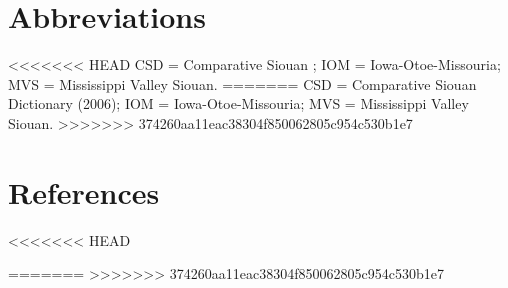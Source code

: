 \documentclass[output=paper]{LSP/langsci}
\begin{document}
\section*{Abbreviations}

<<<<<<< HEAD
CSD = Comparative Siouan \citet{Dictionary2006}; IOM = Iowa-Otoe-Missouria; MVS = Mississippi Valley Siouan.
=======
CSD = Comparative Siouan Dictionary (2006); IOM = Iowa-Otoe-Missouria; MVS = Mississippi Valley Siouan.
>>>>>>> 374260aa11eac38304f850062805c954c530b1e7


\section*{References} 

<<<<<<< HEAD

\printbibliography[heading=subbibliography,notkeyword=this]
=======
\newenvironment{reflist} {\begin{list} {} {\listparindent -.25in
\leftmargin .3in} \item \ \vspace{-.3in} } {\end{list} }
>>>>>>> 374260aa11eac38304f850062805c954c530b1e7
\end{document}
